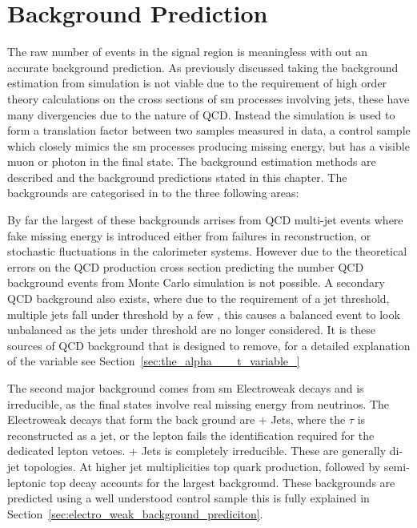 \chapter{Background Prediction} %

The raw number of events in the signal region is meaningless with out 
an accurate background prediction. As previously discussed taking the 
background estimation from simulation is not viable due to the requirement of 
high order theory calculations on the cross sections of \ac{sm} processes 
involving jets, these have many divergencies due to the nature of QCD. Instead 
the simulation is used to form a translation factor between two samples 
measured in data, a control sample which closely mimics the \ac{sm} processes 
producing missing energy, but has a visible muon or photon in the final state. 
The background estimation methods are described and the background predictions 
stated in this chapter. The backgrounds are categorised in to the three following areas:

By far the largest of these backgrounds arrises from QCD multi-jet events where 
fake missing energy is introduced either from failures in reconstruction, or 
stochastic fluctuations in the calorimeter systems.
However due to the theoretical errors on the QCD production cross section 
predicting the number QCD background events from Monte Carlo simulation is not 
possible. A secondary QCD background also exists, where due to the requirement 
of a jet \ET threshold, multiple jets fall under threshold by a few \GeV, this 
causes a balanced event to look unbalanced as the jets under threshold are no 
longer considered. It is these sources of QCD background that \alt is designed 
to remove, for a detailed explanation of the \alt variable see 
Section~\ref{sec:the_alpha___t_variable_}

The second major background comes from \ac{sm} Electroweak decays and 
is irreducible, as the final states involve real missing energy from 
neutrinos. The Electroweak decays that form the back ground are 
\HepProcess{\PW\to\Ptau\Pnu} + Jets, where the $\tau$ is reconstructed as a 
jet, or the lepton fails the identification required for the dedicated lepton 
vetoes. \HepProcess{\PZ\to\Pnu\APnu} + Jets is completely irreducible. These 
are generally di-jet topologies. At higher jet multiplicities top quark 
production, followed by semi-leptonic top decay accounts for the largest 
background. These backgrounds are predicted using a well understood control 
sample this is fully explained in 
Section~\ref{sec:electro_weak_background_prediciton}.

